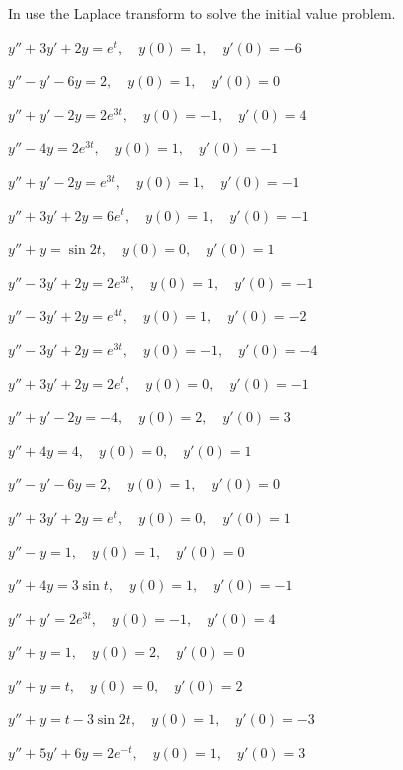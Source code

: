 \exercises
In 
use the Laplace transform to solve the initial value problem.

\begin{exerciselist}
\item\label{exer:8.3.1}$y''+3y'+2y=e^t, \quad  y(0)=1,\quad y'(0)=-6$
\item\label{exer:8.3.2}$y''-y'-6y=2, \quad  y(0)=1,\quad y'(0)=0$
\item\label{exer:8.3.3}$y''+y'-2y=2e^{3t}, \quad  y(0)=-1,\quad y'(0)=4$
\item\label{exer:8.3.4}$y''-4y=2 e^{3t}, \quad  y(0)=1,\quad y'(0)=-1$
\item\label{exer:8.3.5}$y''+y'-2y=e^{3t}, \quad  y(0)=1,\quad y'(0)=-1$
\item\label{exer:8.3.6}$y''+3y'+2y=6e^t, \quad  y(0)=1,\quad y'(0)=-1$
\item\label{exer:8.3.7}$y''+y=\sin2t, \quad  y(0)=0,\quad y'(0)=1$
\item\label{exer:8.3.8}$y''-3y'+2y=2e^{3t}, \quad  y(0)=1,\quad y'(0)=-1$
\item\label{exer:8.3.9}$y''-3y'+2y=e^{4t}, \quad  y(0)=1,\quad y'(0)=-2$
\item\label{exer:8.3.10}$y''-3y'+2y=e^{3t}, \quad  y(0)=-1,\quad y'(0)=-4$
\item\label{exer:8.3.11}$y''+3y'+2y=2e^t, \quad  y(0)=0,\quad y'(0)=-1$
\item\label{exer:8.3.12}$y''+y'-2y=-4, \quad  y(0)=2,\quad y'(0)=3$
\item\label{exer:8.3.13}$y''+4y=4, \quad  y(0)=0,\quad y'(0)=1$
\item\label{exer:8.3.14}$y''-y'-6y=2, \quad  y(0)=1,\quad y'(0)=0$
\item\label{exer:8.3.15}$y''+3y'+2y=e^t, \quad  y(0)=0,\quad y'(0)=1$
\item\label{exer:8.3.16}$y''-y=1, \quad  y(0)=1,\quad y'(0)=0$
\item\label{exer:8.3.17}$y''+4y=3\sin t, \quad  y(0)=1,\quad y'(0)=-1$
\item\label{exer:8.3.18}$y''+y'=2e^{3t}, \quad  y(0)=-1,\quad y'(0)=4$
\item\label{exer:8.3.19}$y''+y=1, \quad  y(0)=2,\quad y'(0)=0$
\item\label{exer:8.3.20}$y''+y=t, \quad  y(0)=0,\quad y'(0)=2$
\item\label{exer:8.3.21}$y''+y=t-3\sin2t, \quad  y(0)=1,\quad y'(0)=-3$
\item\label{exer:8.3.22}$y''+5y'+6y=2e^{-t}, \quad  y(0)=1,\quad y'(0)=3$

\end{exerciselist}
